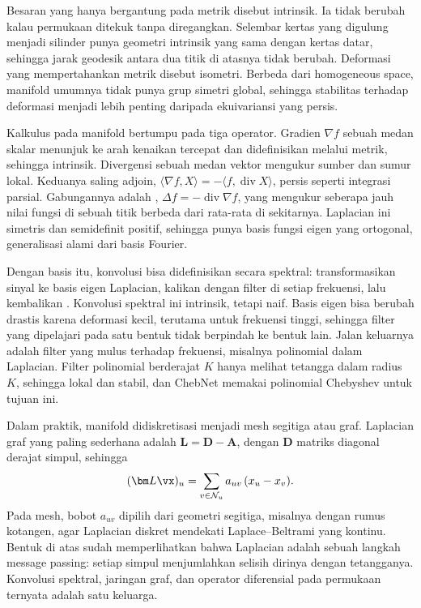 Besaran yang hanya bergantung pada metrik disebut intrinsik. Ia tidak berubah kalau permukaan
ditekuk tanpa diregangkan. Selembar kertas yang digulung menjadi silinder punya geometri intrinsik
yang sama dengan kertas datar, sehingga jarak geodesik antara dua titik di atasnya tidak berubah.
Deformasi yang mempertahankan metrik disebut isometri. Berbeda dari homogeneous space, manifold
umumnya tidak punya grup simetri global, sehingga stabilitas terhadap deformasi menjadi lebih
penting daripada ekuivariansi yang persis.

Kalkulus pada manifold bertumpu pada tiga operator. Gradien $\nabla f$ sebuah medan skalar menunjuk
ke arah kenaikan tercepat dan didefinisikan melalui metrik, sehingga intrinsik. Divergensi sebuah
medan vektor mengukur sumber dan sumur lokal. Keduanya saling adjoin, $\langle\nabla f,X\rangle=-\langle f,\operatorname{div}X\rangle$,
persis seperti integrasi parsial. Gabungannya adalah ,
$\Delta f=-\operatorname{div}\nabla f$, yang mengukur seberapa jauh nilai fungsi di sebuah titik
berbeda dari rata-rata di sekitarnya. Laplacian ini simetris dan semidefinit positif, sehingga punya
basis fungsi eigen yang ortogonal, generalisasi alami dari basis Fourier.

Dengan basis itu, konvolusi bisa didefinisikan secara spektral: transformasikan sinyal ke basis
eigen Laplacian, kalikan dengan filter di setiap frekuensi, lalu kembalikan \citep{bruna2014}.
Konvolusi spektral ini intrinsik, tetapi naif. Basis eigen bisa berubah drastis karena deformasi
kecil, terutama untuk frekuensi tinggi, sehingga filter yang dipelajari pada satu bentuk tidak
berpindah ke bentuk lain. Jalan keluarnya adalah filter yang mulus terhadap frekuensi, misalnya
polinomial dalam Laplacian. Filter polinomial berderajat $K$ hanya melihat tetangga dalam radius
$K$, sehingga lokal dan stabil, dan ChebNet \citep{defferrard2016} memakai polinomial Chebyshev untuk
tujuan ini.

Dalam praktik, manifold didiskretisasi menjadi mesh segitiga atau graf. Laplacian graf yang paling
sederhana adalah $\bm L=\bm D-\bm A$, dengan $\bm D$ matriks diagonal derajat simpul, sehingga
\begin{equation}
(\bm L\vx)_u=\sum_{v\in\mathcal N_u}a_{uv}\,(x_u-x_v).
\end{equation}
Pada mesh, bobot $a_{uv}$ dipilih dari geometri segitiga, misalnya dengan rumus kotangen, agar
Laplacian diskret mendekati Laplace--Beltrami yang kontinu. Bentuk di atas sudah memperlihatkan
bahwa Laplacian adalah sebuah langkah message passing: setiap simpul menjumlahkan selisih dirinya
dengan tetangganya. Konvolusi spektral, jaringan graf, dan operator diferensial pada permukaan
ternyata adalah satu keluarga.

